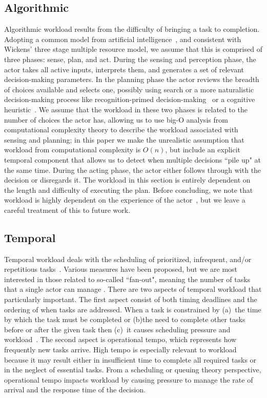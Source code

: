 \subsection{Algorithmic}
Algorithmic workload results from the difficulty of bringing a task to completion. Adopting a common model from artificial intelligence~\cite{Murphy00}, and consistent with Wickens' three stage multiple resource model, we assume that this is comprised of three phases: sense, plan, and act. During the sensing and perception phase, the actor takes all active inputs, interprets them, and generates a set of relevant decision-making parameters. In the planning phase the actor reviews the breadth of choices available and selects one, possibly using search or a more naturalistic decision-making process like recognition-primed decision-making~\cite{ZsambokKlein97} or a cognitive heuristic~\cite{GigerenzerTodd99}. We assume that the workload in these two phases is related to the number of choices the actor has, allowing us to use big-O analysis from computational complexity theory to describe the workload associated with sensing and planning; in this paper we make the unrealistic assumption that workload from computational complexity is $O(n)$, but include an explicit temporal component that allows us to detect when multiple decisions ``pile up" at the same time. During the acting phase, the actor either follows through with the decision or disregards it. The workload in this section is entirely dependent on the length and difficulty of executing the plan. Before concluding, we note that workload is highly dependent on the experience of the actor~\cite{ZsambokKlein97}, but we leave a careful treatment of this to future work.


\subsection{Temporal}
Temporal workload deals with the scheduling of prioritized, infrequent, and/or repetitious tasks~\cite{DessoukyEtAl95,MorayEtAl91}. Various measures have been proposed, but we are most interested in those related to so-called ``fan-out", meaning the number of tasks that a single actor can manage \cite{Goodrich2010,OlsenWood2004,CrandallEtAl2005,Cummings2007}. There are two aspects of temporal workload that particularly important. The first aspect consist of both timing deadlines and the ordering of when tasks are addressed. When a task is constrained by (a)~the time by which the task must be completed or (b)the need to complete other tasks before or after the given task then (c)~it causes scheduling pressure and workload~\cite{MauDolan2006}. The second aspect is operational tempo, which represents how frequently new tasks arrive. High tempo is especially relevant to workload because it may result either in insufficient time to complete all required tasks or in the neglect of essential tasks.  From a scheduling or queuing theory perspective, operational tempo impacts workload by causing pressure to manage the rate of arrival and the response time of the decision.


